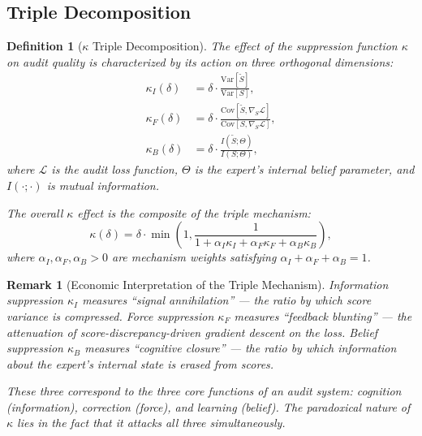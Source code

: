 \documentclass[12pt,a4paper]{article}
\newtheorem{definition}[theorem]{Definition}
\newtheorem{remark}[theorem]{Remark}
\theoremstyle{definition}
\newcommand{\Var}{\mathrm{Var}}
\newcommand{\Cov}{\mathrm{Cov}}
\begin{document}
\subsection{Triple Decomposition}

\begin{definition}[$\kappa$ Triple Decomposition]
\label{def:kappa_decomp}
The effect of the suppression function $\kappa$ on audit quality is characterized by its action on three orthogonal dimensions:
\begin{align}
    \kappa_I(\delta) &= \delta \cdot \frac{\Var[\tilde{S}]}{\Var[S]}, \label{eq:kappa_I} \\
    \kappa_F(\delta) &= \delta \cdot \frac{\Cov[\tilde{S}, \nabla_{\!S}\mathcal{L}]}{\Cov[S, \nabla_{\!S}\mathcal{L}]}, \label{eq:kappa_F} \\
    \kappa_B(\delta) &= \delta \cdot \frac{I(\tilde{S}; \Theta)}{I(S; \Theta)}, \label{eq:kappa_B}
\end{align}
where $\mathcal{L}$ is the audit loss function, $\Theta$ is the expert's internal belief parameter, and $I(\cdot;\cdot)$ is mutual information.

The overall $\kappa$ effect is the composite of the triple mechanism:
\begin{equation}
    \kappa(\delta) = \delta \cdot \min\left(1, \frac{1}{1 + \alpha_I \kappa_I + \alpha_F \kappa_F + \alpha_B \kappa_B}\right),
\end{equation}
where $\alpha_I, \alpha_F, \alpha_B > 0$ are mechanism weights satisfying $\alpha_I + \alpha_F + \alpha_B = 1$.
\end{definition}

\begin{remark}[Economic Interpretation of the Triple Mechanism]
Information suppression $\kappa_I$ measures ``signal annihilation'' --- the ratio by which score variance is compressed. Force suppression $\kappa_F$ measures ``feedback blunting'' --- the attenuation of score-discrepancy-driven gradient descent on the loss. Belief suppression $\kappa_B$ measures ``cognitive closure'' --- the ratio by which information about the expert's internal state is erased from scores.

These three correspond to the three core functions of an audit system: cognition (information), correction (force), and learning (belief). The paradoxical nature of $\kappa$ lies in the fact that it attacks all three simultaneously.
\end{remark}
\end{document}
